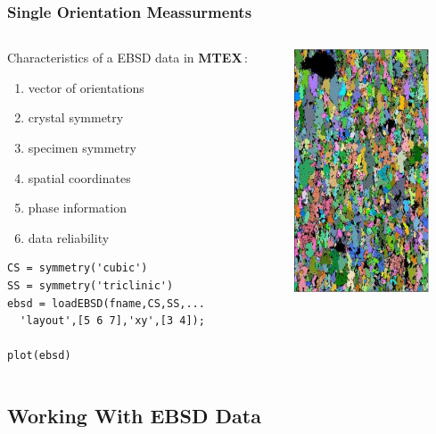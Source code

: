 \documentclass{beamer}
\newcommand{\mtex}{{\large \bf{\color{red}M}TEX\,}}%
\begin{document}
\begin{frame}[fragile]
  \frametitle{Single Orientation Meassurments}

  \begin{columns}

    \begin{column}{7.2cm}

      Characteristics of a EBSD data in \mtex:
      \begin{enumerate}
      \item vector of orientations
      \item crystal symmetry
      \item specimen symmetry
      \item spatial coordinates
      \item phase information
      \item data reliability
      \end{enumerate}

\begin{lstlisting}
CS = symmetry('cubic')
SS = symmetry('triclinic')
ebsd = loadEBSD(fname,CS,SS,...
  'layout',[5 6 7],'xy',[3 4]);

plot(ebsd)
\end{lstlisting}

    \end{column}

    \begin{column}{4cm}
      \includegraphics[width=4cm]{pic/ebsd}
    \end{column}


  \end{columns}
  
\end{frame}

\subsection{Working With EBSD Data}
\end{document}
